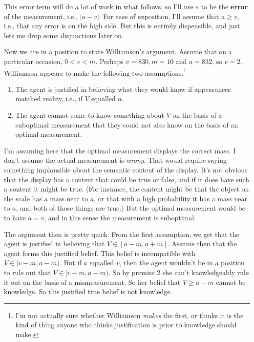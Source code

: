 This error term will do a lot of work in what follows, so I'll  use $e$ to be the \textbf{error} of the measurement, i.e., $|a-v|$. For ease of exposition, I'll assume that $a \geq v$, i.e., that any error is on the high side. But this is entirely dispensible, and just lets me drop some disjunctions later on.

Now we are in a position to state Williamson's argument. Assume that on a particular occasion, $0 < e < m$. Perhaps $v = 830, m =10$ and $a = 832$, so $e = 2$. Williamson appears to make the following two assumptions.\footnote{I'm not actually sure whether Williamson \textit{makes} the first, or thinks it is the kind of thing anyone who thinks justification is prior to knowledge should make.}

\begin{enumerate}
\item The agent is justified in believing what they would know if appearances matched reality, i.e., if $V$ equalled $a$.
\item The agent cannot come to know something about $V$ on the basis of a suboptimal measurement that they could not also know on the basis of an optimal measurement.
\end{enumerate}

\noindent I'm assuming here that the optimal measurement displays the correct mass. I don't assume the actual measurement is \textit{wrong}. That would require saying something implausible about the semantic content of the display. It's not obvious that the display has a content that could be true or false, and if it does have such a content it might be true. (For instance, the content might be that the object on the scale has a mass near to $a$, or that with a high probability it has a mass near to $a$, and both of those things are true.) But the optimal measurement would be to have $a = v$, and in this sense the measurement is suboptimal.

The argument then is pretty quick. From the first assumption, we get that the agent is justified in believing that $V \in [a - m, a + m]$. Assume then that the agent forms this justified belief. This belief is incompatible with $V \in [v - m, a - m)$. But if $a$ equalled $v$, then the agent wouldn't be in a position to rule out that $V \in [v - m, a - m)$. So by premise 2 she can't knowledgeably rule it out on the basis of a mismeasurement. So her belief that $V \geq a - m$ cannot be knowledge. So this justified true belief is not knowledge.

